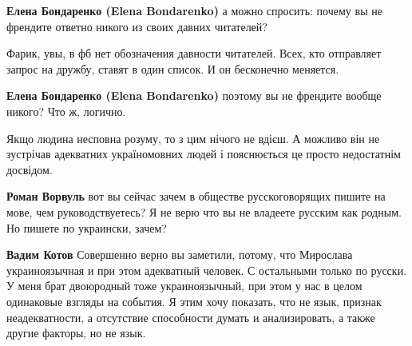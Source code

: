 \begin{itemize}
\begin{itemize}
\textbf{Елена Бондаренко (Elena Bondarenko)} а можно спросить: почему вы не френдите ответно никого из своих давних читателей?

 

Фарик, увы, в фб нет обозначения давности читателей. Всех, кто отправляет запрос на дружбу, ставят в один список. И он бесконечно меняется.

 
\textbf{Елена Бондаренко (Elena Bondarenko)} поэтому вы не френдите вообще никого? Что ж, логично.
\end{itemize}

 

Якщо людина несповна розуму, то з цим нічого не вдієш. А можливо він не
зустрічав адекватних україномовних людей і пояснюється це просто недостатнім
досвідом.

\begin{itemize}
 
\textbf{Роман Ворвуль} вот вы сейчас зачем в обществе русскоговорящих пишите на мове, чем руководствуетесь?
Я не верю что вы не владеете русским как родным. Но пишете по украински, зачем?

 
\textbf{Вадим Котов} Совершенно верно вы заметили, потому, что Мирослава
украиноязычная и при этом адекватный человек. С остальными только по русски. У
меня брат двоюродный тоже украиноязычный, при этом у нас в целом одинаковые
взгляды на события. Я этим хочу показать, что не язык, признак неадекватности,
а отсутствие способности думать и анализировать, а также другие факторы, но не
язык.


\end{itemize}
\end{itemize}
